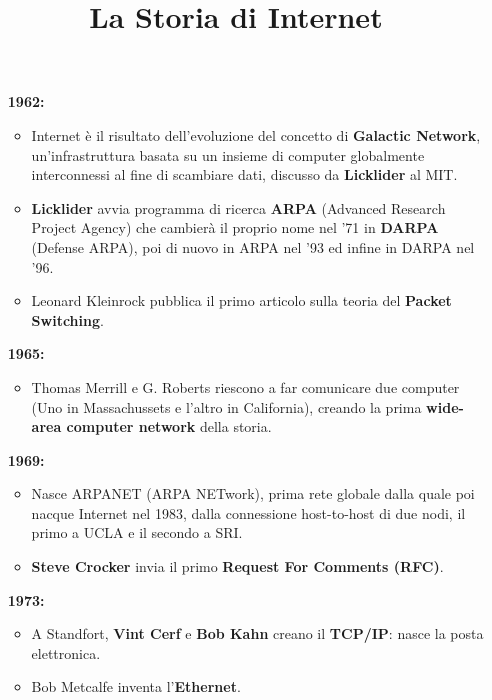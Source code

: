 \documentclass[a4paper,11pt]{article}
\title{La Storia di Internet}
\begin{document}
\newpage
\tableofcontents
\newpage

\maketitle
\begin{itemize}
\item[\textbf{1962:}] \begin{itemize}
\item Internet è il risultato dell'evoluzione del concetto di \textbf{Galactic Network}, un'infrastruttura basata su un insieme di computer globalmente interconnessi al fine di scambiare dati, discusso da \textbf{Licklider} al MIT.
\item \textbf{Licklider} avvia programma di ricerca \textbf{ARPA} (Advanced Research Project Agency) che cambierà il proprio nome  nel '71 in \textbf{DARPA} (Defense ARPA), poi di nuovo in ARPA nel '93 ed infine in DARPA nel '96.
\item Leonard Kleinrock pubblica il primo articolo sulla teoria del \textbf{Packet Switching}.
\end{itemize}
\item[\textbf{1965:}] \begin{itemize}
\item Thomas Merrill e G. Roberts riescono a far comunicare due computer (Uno in Massachussets e l'altro in California), creando la prima \textbf{wide-area computer network} della storia.
\end{itemize} 

\item[\textbf{1969:}] \begin{itemize}
\item Nasce ARPANET (ARPA NETwork), prima rete globale dalla quale poi nacque Internet nel 1983, dalla connessione host-to-host di due nodi, il primo a UCLA e il secondo a SRI.
\item \textbf{Steve Crocker} invia il primo \textbf{Request For Comments (RFC)}.
\end{itemize} 

\item[\textbf{1973:}] \begin{itemize}
\item A Standfort, \textbf{Vint Cerf} e \textbf{Bob Kahn} creano il \textbf{TCP/IP}: nasce la posta elettronica.
\item Bob Metcalfe inventa l'\textbf{Ethernet}.
\end{itemize}


\end{itemize}
\end{document}
